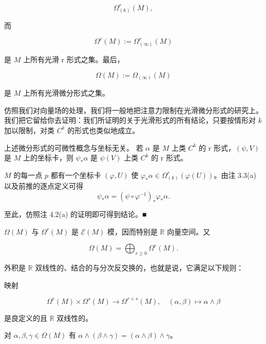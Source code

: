 \[
\Omega_{(k)}^{r}(M),
\]

而

\[
\Omega^{r}(M) := \Omega_{(\infty)}^{r}(M)
\]

是 $ M $ 上所有光滑 r 形式之集。最后，

\[
\Omega(M) := \Omega_{(\infty)}(M)
\]

是 $ M $ 上所有光滑微分形式之集。

仿照我们对向量场的处理，我们将一般地把注意力限制在光滑微分形式的研究上。我们把它留给你去证明：我们所证明的关于光滑形式的所有结论，只要按情形对 $ k $ 加以限制，对类 $ C^{k} $ 的形式也类似地成立。

\begin{remark}

\begin{items}
\item

上述微分形式的可微性概念与坐标无关。
若 $ \alpha $ 是 $ M $ 上类 $ C^{k} $ 的 r 形式，$ (\psi,V) $ 是 $ M $ 上的坐标卡，则 $ \psi_{\ast}\alpha $ 是 $ \psi(V) $ 上类 $ C^{k} $ 的 r 形式。

\proofhead
$ M $ 的每一点 $ p $ 都有一个坐标卡 $ (\varphi,U) $ 使 $ \varphi_{\ast}\alpha\in\Omega_{(k)}^{r}(\varphi(U)) $。由注 3.3(a) 以及前推的逐点定义可得
\[
\psi_{\ast}\alpha = (\psi\circ\varphi^{-1})_{\ast}\varphi_{\ast}\alpha.
\]

至此，仿照注 4.2(a) 的证明即可得到结论。\nobreak\hspace{0.35em}■

\item

$ \Omega(M) $ 与 $ \Omega^{r}(M) $ 是 $ \mathcal{E}(M) $ 模，因而特别是 $ \mathbb{R} $ 向量空间。又

\[
\Omega(M) = \bigoplus_{r\ge 0}\Omega^{r}(M).
\]

外积是 $ \mathbb{R} $ 双线性的、结合的与分次反交换的，也就是说，它满足以下规则：

\begin{subitems}
\item

映射

\[
\Omega^{r}(M)\times\Omega^{s}(M)\to\Omega^{r+s}(M), \quad (\alpha,\beta)\mapsto\alpha\wedge\beta
\]

是良定义的且 $ \mathbb{R} $ 双线性的。

\item

对 $ \alpha,\beta,\gamma\in\Omega(M) $ 有 $ \alpha\wedge(\beta\wedge\gamma) = (\alpha\wedge\beta)\wedge\gamma $。


\end{subitems}
\end{items}
\end{remark}
